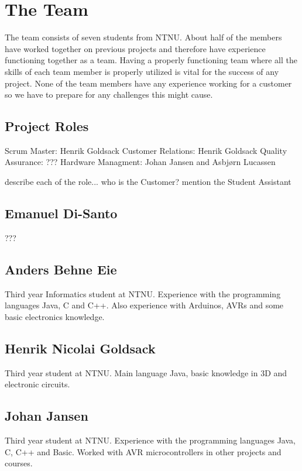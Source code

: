 \section{The Team}
The team consists of seven students from NTNU. About half of the members have worked
together on previous projects and therefore have experience functioning together as a
team. Having a properly functioning team where all the skills of each team member is properly
utilized is vital for the success of any project. None of the team members have any experience 
working for a customer so we have to prepare for any challenges this might cause.


\subsection{Project Roles}
Scrum Master: Henrik Goldsack\newline
Customer Relations: Henrik Goldsack\newline
Quality Assurance: ???\newline
Hardware Managment: Johan Jansen and Asbjørn Lucassen\newline

\todo 
{
describe each of the role... who is the Customer? mention the Student Assistant
}

\subsection{Emanuel Di-Santo}
???

\subsection{Anders Behne Eie}
Third year Informatics student at NTNU. Experience with the programming languages Java, C and C++. Also experience with Arduinos, AVRs and some basic electronics knowledge.

\subsection{Henrik Nicolai Goldsack}
Third year student at NTNU. Main language Java, basic knowledge in 3D and electronic circuits.

\subsection{Johan Jansen} 
Third year student at NTNU. Experience with the programming languages Java, C, C++  and 
Basic. Worked with AVR microcontrollers in other projects and courses.

